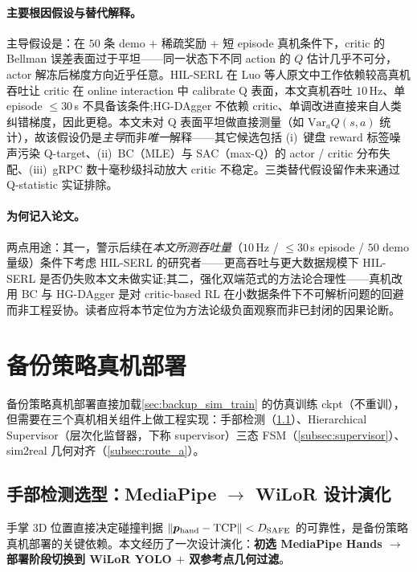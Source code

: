 \paragraph{主要根因假设与替代解释。}主导假设是：在 $50$ 条 demo $+$ 稀疏奖励 $+$ 短 episode 真机条件下，critic 的 Bellman 误差表面过于平坦——同一状态下不同 action 的 $Q$ 估计几乎不可分，actor 解冻后梯度方向近乎任意。HIL-SERL 在 Luo 等人原文中工作依赖较高真机吞吐让 critic 在 online interaction 中 calibrate Q 表面，本文真机吞吐 $10$\,Hz、单 episode $\le 30$\,s 不具备该条件;HG-DAgger 不依赖 critic、单调改进直接来自人类纠错梯度，因此更稳。本文未对 Q 表面平坦做直接测量（如 $\text{Var}_a Q(s, a)$ 统计），故该假设仍是\emph{主导}而非\emph{唯一}解释——其它候选包括 (i)~键盘 reward 标签噪声污染 Q-target、(ii)~BC（MLE）与 SAC（max-Q）的 actor / critic 分布失配、(iii)~gRPC 数十毫秒级抖动放大 critic 不稳定。三类替代假设留作未来通过 Q-statistic 实证排除。

\paragraph{为何记入论文。}两点用途：其一，警示后续在\emph{本文所测吞吐量}（$10$\,Hz / $\le 30$\,s episode / $50$ demo 量级）条件下考虑 HIL-SERL 的研究者——更高吞吐与更大数据规模下 HIL-SERL 是否仍失败本文未做实证;其二，强化双端范式的方法论合理性——真机改用 BC 与 HG-DAgger 是对 critic-based RL 在小数据条件下不可解析问题的回避而非工程妥协。读者应将本节定位为方法论级负面观察而非已封闭的因果论断。

\section{备份策略真机部署}\label{sec:backup_real_deploy}

备份策略真机部署直接加载\cref{sec:backup_sim_train} 的仿真训练 ckpt（不重训），但需要在三个真机相关组件上做工程实现：手部检测（\cref{sec:hand_detection_evolution}）、Hierarchical Supervisor（层次化监督器，下称 supervisor）三态 FSM（\cref{subsec:supervisor}）、sim2real 几何对齐（\cref{subsec:route_a}）。

\subsection{手部检测选型：MediaPipe $\to$ WiLoR 设计演化}\label{sec:hand_detection_evolution}

手掌 3D 位置直接决定碰撞判据 $\lVert \bm{p}_\text{hand} - \text{TCP}\rVert < D_\text{SAFE}$ 的可靠性，是备份策略真机部署的关键依赖。本文经历了一次设计演化：\textbf{初选 MediaPipe Hands $\to$ 部署阶段切换到 WiLoR YOLO $+$ 双参考点几何过滤}。

